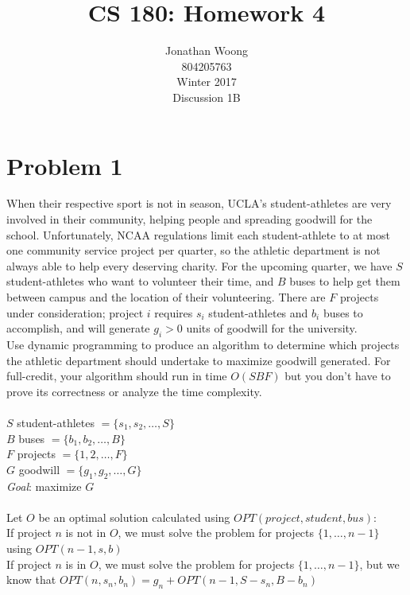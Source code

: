 \documentclass[10pt,letterpaper]{article}
\date{\displaydate{date}}
\newcommand\tab[1][0.5cm]{\hspace*{#1}}
\begin{document}
\title{CS 180: Homework 4}
\author{
	Jonathan Woong\\
	804205763\\
	Winter 2017\\
	Discussion 1B}
\maketitle
\pagebreak


\section{Problem 1}
When their respective sport is not in season, UCLA's student-athletes are very involved in their community, helping people and spreading goodwill for the school. Unfortunately, NCAA regulations limit each student-athlete to at most one community service project per quarter, so the athletic department is not always able to help every deserving charity. For the upcoming quarter, we have $S$ student-athletes who want to volunteer their time, and $B$ buses to help get them between campus and the location of their volunteering. There are $F$ projects under consideration; project $i$ requires $s_i$ student-athletes and $b_i$ buses to accomplish, and will generate $g_i > 0$ units of goodwill for the university.\\
Use dynamic programming to produce an algorithm to determine which projects the athletic department should undertake to maximize goodwill generated.  For full-credit, your algorithm should run in time $O(S B F)$ but you don't have to prove its correctness or analyze the time complexity.\\\\
$S$ student-athletes $=\{s_1, s_2, \dots, S\}$\\
$B$ buses $=\{b_1, b_2, \dots, B\}$\\
$F$ projects $=\{1, 2, \dots, F\}$\\
$G$ goodwill $=\{g_1, g_2, \dots, G\}$\\
\textit{Goal}: maximize $G$\\\\
Let $O$ be an optimal solution calculated using $OPT(project,student,bus)$:\\
\tab If project $n$ is not in $O$, we must solve the problem for projects $\{1,\dots,n-1\}$ using $OPT(n-1,s,b)$\\
\tab If project $n$ is in $O$, we must solve the problem for projects $\{1,\dots,n-1\}$, but we know that $OPT(n,s_n,b_n)=g_n+OPT(n-1,S-s_n,B-b_n)$\\\\
\end{document}
